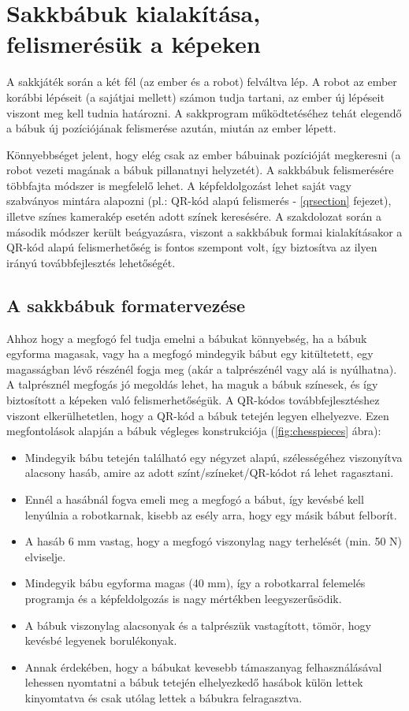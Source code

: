 \documentclass[../documentation.tex]{subfiles}
\begin{document}
\section{Sakkbábuk kialakítása, felismerésük a képeken}
A sakkjáték során a két fél (az ember és a robot) felváltva lép. A robot az ember korábbi lépéseit (a sajátjai mellett) számon tudja tartani, az ember új lépéseit viszont meg kell tudnia határozni. A sakkprogram működtetéséhez tehát elegendő a bábuk új pozíciójának felismerése azután, miután az ember lépett.

Könnyebbséget jelent, hogy elég csak az ember bábuinak pozícióját megkeresni (a robot vezeti magának a bábuk pillanatnyi helyzetét). A sakkbábuk felismerésére többfajta módszer is megfelelő lehet. A képfeldolgozást lehet saját vagy szabványos mintára alapozni (pl.: QR-kód alapú felismerés - \ref{qrsection} fejezet), illetve színes kamerakép esetén adott színek keresésére. A szakdolozat során a második módszer került beágyazásra, viszont a sakkbábuk formai kialakításakor a QR-kód alapú felismerhetőség is fontos szempont volt, így biztosítva az ilyen irányú továbbfejlesztés lehetőségét.

\subsection{A sakkbábuk formatervezése}
Ahhoz hogy a megfogó fel tudja emelni a bábukat könnyebség, ha a bábuk egyforma magasak, vagy ha a megfogó mindegyik bábut egy kitültetett, egy magasságban lévő részénél fogja meg (akár a talprészénél vagy alá is nyúlhatna). A talprésznél megfogás jó megoldás lehet, ha maguk a bábuk színesek, és így biztosított a képeken való felismerhetőségük. A QR-kódos továbbfejlesztéshez viszont elkerülhetetlen, hogy a QR-kód a bábuk tetején legyen elhelyezve. Ezen megfontolások alapján a bábuk végleges konstrukciója (\ref{fig:chesspieces} ábra):
\begin{itemize}
	\item Mindegyik bábu tetején található egy négyzet alapú, szélességéhez viszonyítva alacsony hasáb, amire az adott színt/színeket/QR-kódot rá lehet ragasztani.
	\item Ennél a hasábnál fogva emeli meg a megfogó a bábut, így kevésbé kell lenyúlnia a robotkarnak, kisebb az esély arra, hogy egy másik bábut felborít.
	\item A hasáb 6 mm vastag, hogy a megfogó viszonylag nagy terhelését (min. 50 N) elviselje.
	\item Mindegyik bábu egyforma magas (40 mm), így a robotkarral felemelés programja és a képfeldolgozás is nagy mértékben leegyszerűsödik.
	\item A bábuk viszonylag alacsonyak és a talprészük vastagított, tömör, hogy kevésbé legyenek borulékonyak.
	\item Annak érdekében, hogy a bábukat kevesebb támaszanyag felhasználásával lehessen nyomtatni a bábuk tetején elhelyezkedő hasábok külön lettek kinyomtatva és csak utólag lettek a bábukra felragasztva.
\end{itemize}
\end{document}
